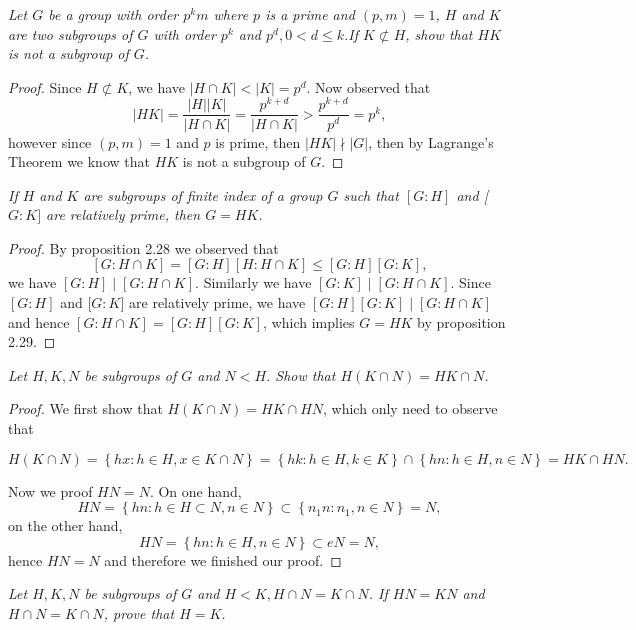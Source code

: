 \begin{problem}\em
Let $G$ be a group with order $p^km$ where $p$ is a prime and $(p,m)=1$, $H$ and $K$ are two subgroups of $G$ with order $p^k$ and $p^d,0<d\le k$.If $K\not\subset H$, show that $HK$ is not a subgroup of $G$.
\end{problem}
\begin{proof}
Since $H\not\subset K$, we have $|H\cap K|<|K|=p^d$. Now observed that 
$$
\left| HK \right|=\frac{\left| H \right|\left| K \right|}{\left| H\cap K \right|}=\frac{p^{k+d}}{\left| H\cap K \right|}>\frac{p^{k+d}}{p^d}=p^k,
$$
however since $(p,m)=1$ and $p$ is prime, then $|HK|\nmid|G|$, then by Lagrange's Theorem we know that $HK$ is not a subgroup of $G$.
\end{proof}
\begin{problem}\em
 If $H$ and $K$ are subgroups of finite index of a group $G$ such that $[G:H]$ and [$G:K]$ are relatively prime, then $G=HK$. 
\end{problem}
\begin{proof}
By proposition 2.28 we observed that 
$$
\left[ G:H\cap K \right] =\left[ G:H \right] \left[ H:H\cap K \right] \le \left[ G:H \right] \left[ G:K \right] ,
$$
we have $\left[ G:H \right] \mid \left[ G:H\cap K \right] $. Similarly we have $\left[ G:K \right] \mid \left[ G:H\cap K \right] $. Since $[G:H]$ and [$G:K]$ are relatively prime, we have $\left[ G:H \right] \left[ G:K \right] \mid \left[ G:H\cap K \right] $ and hence $\left[ G:H\cap K \right] =\left[ G:H \right] \left[ G:K \right] $, which implies $G=HK$ by proposition 2.29.
\end{proof}
\begin{problem}\em
Let $H,K,N$ be subgroups of $G$ and $N<H$. Show that $H(K\cap N)=HK\cap N$.
\end{problem}
\begin{proof}
We first show that $H(K\cap N)=HK\cap HN$, which only need to observe that 
\begin{small}
$$
H\left( K\cap N \right) =\left\{ hx:h\in H,x\in K\cap N \right\} =\left\{ hk:h\in H,k\in K \right\} \cap \left\{ hn:h\in H,n\in N \right\} =HK\cap HN.
$$    
\end{small}
Now we proof $HN=N$. On one hand, 
$$
HN=\left\{ hn:h\in H\subset N,n\in N \right\} \subset \left\{ n_1n:n_1,n\in N \right\} =N,
$$
on the other hand, 
$$
HN=\left\{ hn:h\in H,n\in N \right\} \subset eN=N,
$$
hence $HN=N$ and therefore we finished our proof.
\end{proof}
\begin{problem}\em
Let $H,K,N$ be subgroups of $G$ and $H<K,H\cap N=K\cap N$. If $HN=KN$ and $H\cap N=K\cap N$, prove that $H=K$.
\end{problem}
